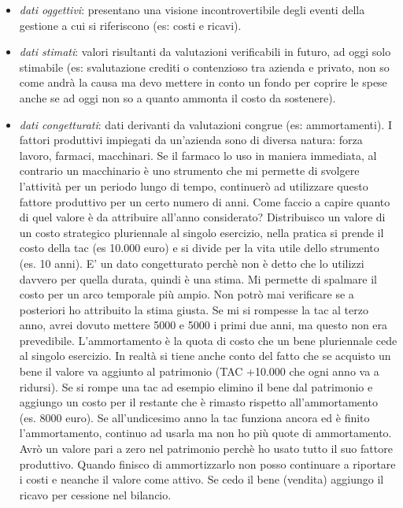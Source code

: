\documentclass[]{article}
\begin{document}
\begin{itemize}
\item
  \emph{dati oggettivi}: presentano una visione incontrovertibile degli
  eventi della gestione a cui si riferiscono (es: costi e ricavi).
\item
  \emph{dati stimati}: valori risultanti da valutazioni verificabili in
  futuro, ad oggi solo stimabile (es: svalutazione crediti o contenzioso
  tra azienda e privato, non so come andrà la causa ma devo mettere in
  conto un fondo per coprire le spese anche se ad oggi non so a quanto
  ammonta il costo da sostenere).
\item
  \emph{dati congetturati}: dati derivanti da valutazioni congrue (es:
  ammortamenti). I fattori produttivi impiegati da un'azienda sono di
  diversa natura: forza lavoro, farmaci, macchinari. Se il farmaco lo
  uso in maniera immediata, al contrario un macchinario è uno strumento
  che mi permette di svolgere l'attività per un periodo lungo di tempo,
  continuerò ad utilizzare questo fattore produttivo per un certo numero
  di anni. Come faccio a capire quanto di quel valore è da attribuire
  all'anno considerato? Distribuisco un valore di un costo strategico
  pluriennale al singolo esercizio, nella pratica si prende il costo
  della tac (es 10.000 euro) e si divide per la vita utile dello
  strumento (es. 10 anni). E' un dato congetturato perchè non è detto
  che lo utilizzi davvero per quella durata, quindi è una stima. Mi
  permette di spalmare il costo per un arco temporale più ampio. Non
  potrò mai verificare se a posteriori ho attribuito la stima giusta. Se
  mi si rompesse la tac al terzo anno, avrei dovuto mettere 5000 e 5000
  i primi due anni, ma questo non era prevedibile. L'ammortamento è la
  quota di costo che un bene pluriennale cede al singolo esercizio. In
  realtà si tiene anche conto del fatto che se acquisto un bene il
  valore va aggiunto al patrimonio (TAC +10.000 che ogni anno va a
  ridursi). Se si rompe una tac ad esempio elimino il bene dal
  patrimonio e aggiungo un costo per il restante che è rimasto rispetto
  all'ammortamento (es. 8000 euro). Se all'undicesimo anno la tac
  funziona ancora ed è finito l'ammortamento, continuo ad usarla ma non
  ho più quote di ammortamento. Avrò un valore pari a zero nel
  patrimonio perchè ho usato tutto il suo fattore produttivo. Quando
  finisco di ammortizzarlo non posso continuare a riportare i costi e
  neanche il valore come attivo. Se cedo il bene (vendita) aggiungo il
  ricavo per cessione nel bilancio.
\end{itemize}
\end{document}

